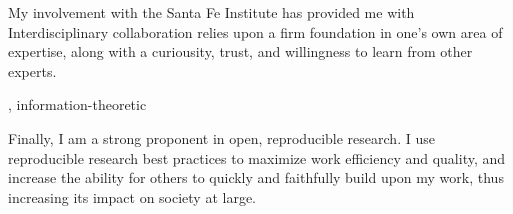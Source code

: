 \documentclass[12pt]{article}
\begin{document}
My involvement with the Santa Fe Institute has provided
me with  
Interdisciplinary collaboration relies upon a firm
foundation in one's own area of expertise, along
with a curiousity, trust, and willingness to learn
from other experts.

, information-theoretic 

Finally, I am a strong proponent in open, 
reproducible research. 
I use reproducible research best practices 
to maximize work efficiency and quality, and increase
the ability for others to quickly and faithfully 
build upon my work, thus increasing its impact
on society at large.


\end{document}
